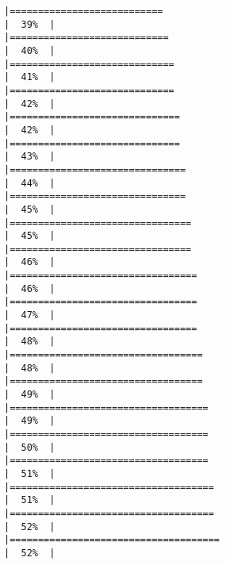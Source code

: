 \documentclass[
]{article}
\begin{document}
\begin{verbatim}
|===========================                                           |  39%  |                                                                              |============================                                          |  40%  |                                                                              |=============================                                         |  41%  |                                                                              |=============================                                         |  42%  |                                                                              |==============================                                        |  42%  |                                                                              |==============================                                        |  43%  |                                                                              |===============================                                       |  44%  |                                                                              |===============================                                       |  45%  |                                                                              |================================                                      |  45%  |                                                                              |================================                                      |  46%  |                                                                              |=================================                                     |  46%  |                                                                              |=================================                                     |  47%  |                                                                              |=================================                                     |  48%  |                                                                              |==================================                                    |  48%  |                                                                              |==================================                                    |  49%  |                                                                              |===================================                                   |  49%  |                                                                              |===================================                                   |  50%  |                                                                              |===================================                                   |  51%  |                                                                              |====================================                                  |  51%  |                                                                              |====================================                                  |  52%  |                                                                              |=====================================                                 |  52%  |                                                                              
\end{verbatim}
\end{document}
